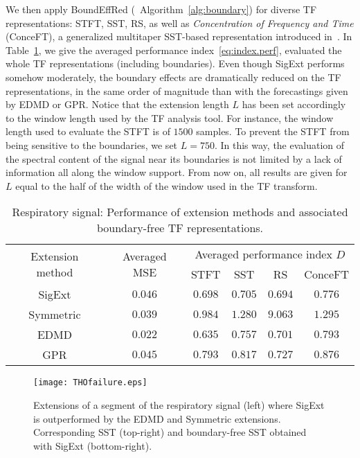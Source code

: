 We then apply {\sf BoundEffRed} (\ie~Algorithm~\ref{alg:boundary}) for diverse TF representations: STFT, SST, RS, as well as \textit{Concentration of Frequency and Time} (ConceFT), a generalized multitaper SST-based representation introduced in~\cite{Daubechies16conceft}. In Table~\ref{tab:THO}, we give the averaged performance index~\eqref{eq:index.perf}, evaluated the whole TF representations (including boundaries). Even though {\sf SigExt} performs somehow moderately, the boundary effects are dramatically reduced on the TF representations, in the same order of magnitude than with the forecastings given by EDMD or GPR. Notice that the extension length $L$ has been set accordingly to the window length used by the TF analysis tool. For instance, the window length used to evaluate the STFT is of $1500$ samples. To prevent the STFT from being sensitive to the boundaries, we set $L=750$. In this way, the evaluation of the spectral content of the signal near its boundaries is not limited by a lack of information all along the window support. From now on, all results are given for $L$ equal to the half of the width of the window used in the TF transform.

\begin{table}
\centering
\caption{Respiratory signal: Performance of extension methods and associated boundary-free TF representations.}
\begin{tabular}{|c||c||c|c|c|c|}
  \hline
   \multirow{2}{40pt}{\centering Extension method} & \multirow{2}{35pt}{\centering Averaged MSE} & \multicolumn{4}{c|}{Averaged performance index $D$} \\
   \cline{3-6}
      & & STFT & SST & RS & ConceFT \\
   \hhline{|=#=#=|=|=|=|}
   {\sf SigExt} & $0.046$ & $0.698$ &  $0.705$ & $0.694$ & $0.776$ \\
   \hline
   Symmetric & $0.039$ & $0.984$ & $1.280$ & $9.063$ & $1.295$ \\
   \hline
   EDMD & $0.022$ & $0.635$ &  $0.757$ & $0.701$ & $0.793$ \\
   \hline
   GPR & $0.045$ & $0.793$ &  $0.817$ & $0.727$ & $0.876$ \\ 
   \hline
\end{tabular}
\label{tab:THO}
\end{table}

\begin{figure}
\centering
\texttt{[image: THOfailure.eps]}
\caption{Extensions of a segment of the respiratory signal (left) where {\sf SigExt} is outperformed by the EDMD and Symmetric extensions. Corresponding SST (top-right) and boundary-free SST obtained with {\sf SigExt} (bottom-right).}
\label{fig:THO.failure}
\end{figure} 

